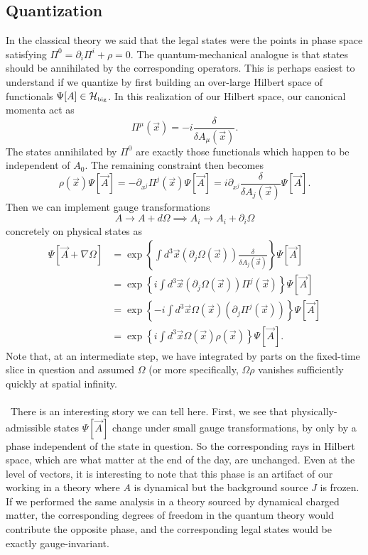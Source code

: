 \documentclass[11pt,letterpaper]{article}
\newcommand{\LP}{\left(}
\newcommand{\RP}{\right)}
\newcommand{\mc}[1]{\mathcal{#1}}
\newcommand{\D}{\partial}
\begin{document}
\subsection{Quantization}
In the classical theory we said that the legal states were the points in phase space satisfying $\Pi^0 = \D_i \Pi^i + \rho = 0$. The quantum-mechanical analogue is that states should be annihilated by the corresponding operators. This is perhaps easiest to understand if we quantize by first building an over-large Hilbert space of functionals $\Psi[A] \in \mc{H}_{\mbox{\tiny{big}}}$. In this realization of our Hilbert space, our canonical momenta act as \begin{equation}
\Pi^\mu(\vec{x}) = -i \frac{\delta}{\delta A_\mu(\vec{x})}.
\end{equation}
The states annihilated by $\Pi^0$ are exactly those functionals which happen to be independent of $A_0$. The remaining constraint then becomes \begin{equation}
\rho(\vec{x}) \Psi[\vec{A}] = - \D_{x^j} \Pi^j(\vec{x}) \Psi[\vec{A}] = i \D_{x^j} \frac{\delta}{\delta A_j(\vec{x})} \Psi[\vec{A} ].
\end{equation}
Then we can implement gauge transformations \begin{equation}
A \to A + d \Omega \implies A_i \to A_i + \D_i \Omega
\end{equation}
concretely on physical states as \begin{equation}
\begin{aligned}
\Psi[\vec{A} + \nabla \Omega] & = \exp \left\{ \int d^3 \vec{x} \LP \D_j \Omega(\vec{x}) \RP \frac{\delta}{\delta A_j(\vec{x})} \right\} \Psi[\vec{A}] \\
& = \exp \left\{ i \int d^3 \vec{x} \LP \D_j \Omega(\vec{x}) \RP \Pi^j(\vec{x}) \right\} \Psi[\vec{A}] \\
& = \exp \left\{ - i \int d^3 \vec{x}  \Omega(\vec{x}) \LP   \D_j \Pi^j(\vec{x}) \RP \right\} \Psi[\vec{A}] \\
& = \exp \left\{ i \int d^3 \vec{x}  \Omega(\vec{x}) \rho(\vec{x})  \right\} \Psi[\vec{A}].
\end{aligned}
\end{equation}
Note that, at an intermediate step, we have integrated by parts on the fixed-time slice in question and assumed $\Omega$ (or more specifically, $\Omega \rho$ vanishes sufficiently quickly at spatial infinity. \\
\\
\
There is an interesting story we can tell here. First, we see that physically-admissible states $\Psi[\vec{A}]$ change under small gauge transformations, by only by a phase independent of the state in question. So the corresponding rays in Hilbert space, which are what matter at the end of the day, are unchanged. Even at the level of vectors, it is interesting to note that this phase is an artifact of our working in a theory where $A$ is dynamical but the background source $J$ is frozen. If we performed the same analysis in a theory sourced by dynamical charged matter, the corresponding degrees of freedom in the quantum theory would contribute the opposite phase, and the corresponding legal states would be exactly gauge-invariant. 
\end{document}
